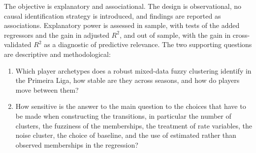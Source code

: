 The objective is explanatory and associational. The design is observational, no causal identification strategy is introduced, and findings are reported as associations. Explanatory power is assessed in sample, with tests of the added regressors and the gain in adjusted $R^2$, and out of sample, with the gain in cross-validated $R^2$ as a diagnostic of predictive relevance. The two supporting questions are descriptive and methodological:

\begin{enumerate}
	\item[RQ1.] Which player archetypes does a robust mixed-data fuzzy clustering identify in the Primeira Liga, how stable are they across seasons, and how do players move between them?
	\item[RQ2.] How sensitive is the answer to the main question to the choices that have to be made when constructing the transitions, in particular the number of clusters, the fuzziness of the memberships, the treatment of rate variables, the noise cluster, the choice of baseline, and the use of estimated rather than observed memberships in the regression?
\end{enumerate}

